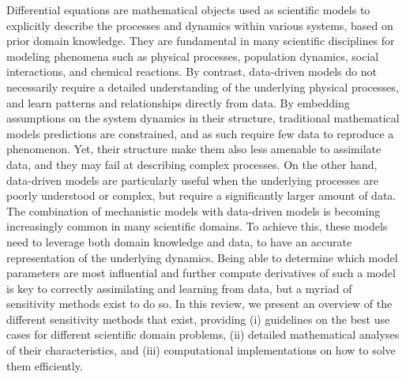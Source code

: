Differential equations are mathematical objects used as scientific models to explicitly describe the processes and dynamics within various systems, based on prior domain knowledge. 
They are fundamental in many scientific disciplines for modeling phenomena such as physical processes, population dynamics, social interactions, and chemical reactions.
By contrast, data-driven models do not necessarily require a detailed understanding of the underlying physical processes, and learn patterns and relationships directly from data.  By embedding assumptions on the system dynamics in their structure, traditional mathematical models predictions are constrained, and as such require few data to reproduce a phenomenon. Yet, their structure make them also less amenable to assimilate data, and they may fail at describing complex processes.
 On the other hand, data-driven models are particularly useful when the underlying processes are poorly understood or complex, but require a significantly larger amount of data.
The combination of mechanistic models with data-driven models is becoming increasingly common in many scientific domains. 
To achieve this, these models need to leverage both domain knowledge and data, to have an accurate representation of the underlying dynamics. 
Being able to determine which model parameters are most influential and further compute derivatives of such a model is key to correctly assimilating and learning from data, but a myriad of sensitivity methods exist to do so. 
In this review, we present an overview of the different sensitivity methods that exist, providing (i) guidelines on the best use cases for different scientific domain problems, (ii) detailed mathematical analyses of their characteristics, and (iii) computational implementations on how to solve them efficiently. 
